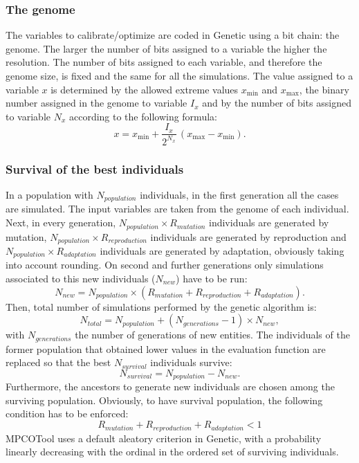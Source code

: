 \documentclass[review,authoryear]{elsarticle}
\newcommand{\EQ}[2]
{\begin{equation}#1\label{#2}\end{equation}}
\begin{document}
\subsubsection{The genome}

The variables to calibrate/optimize are coded in Genetic using a bit chain: the
genome. The larger the number of bits assigned to a variable the higher the resolution.
The number of bits assigned to each variable, and therefore the genome size, is fixed and the same for all the 
simulations.
The value assigned to a variable $x$ is determined by the allowed extreme values $x_{\min}$ and $x_{\max}$, the binary number assigned in the genome to variable $I_x$ and by the number of bits assigned to variable $N_x$ according to
the following formula:
\EQ{x=x_{\min}+\frac{I_x}{2^{N_x}}\,\left(x_{\max}-x_{\min}\right).}{EqGenome}

\subsubsection{Survival of the best individuals}

In a population with $N_{population}$ individuals, in the first generation all the cases are simulated. The input variables are
taken from the genome of each individual. Next, in every generation, $N_{population}\times R_{mutation}$ individuals are generated by mutation, $N_{population}\times R_{reproduction}$ individuals are generated by reproduction and $N_{population}\times R_{adaptation}$ individuals are generated by adaptation, obviously
taking into account rounding. On second and further generations only simulations
associated to this new individuals ($N_{new}$) have to be run:
\EQ
{
	N_{new}=N_{population}
	\times\left(R_{mutation}+R_{reproduction}+R_{adaptation}\right).
}{EqNew}
Then, total number of simulations performed by the genetic algorithm is:
\EQ
{
	N_{total}=N_{population}+\left(N_{generations}-1\right)\times N_{new},
}{EqGeneticNumber}
with $N_{generations}$ the number of generations of new entities.
The individuals of the former population that obtained lower values in the evaluation function are replaced so that the best $N_{survival}$ individuals survive:
\EQ
{
	N_{survival}=N_{population}-N_{new}.
}{EqSurvival}
Furthermore, the ancestors to generate new individuals are chosen among the surviving population. Obviously, to have survival population, the following condition has to be enforced:
\EQ{R_{mutation}+R_{reproduction}+R_{adaptation}<1}{EqSurvivalCondition}
MPCOTool uses a default aleatory criterion in Genetic, with a probability linearly decreasing with the ordinal in the ordered set of surviving individuals.
\end{document}
